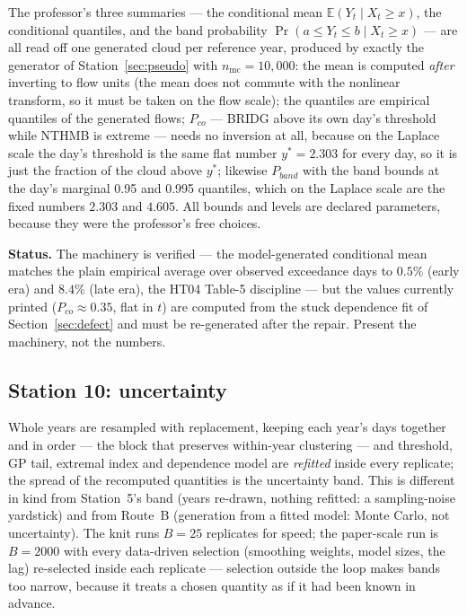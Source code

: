 \documentclass[11pt]{article}
\begin{document}
The professor's three summaries --- the conditional mean
$\mathbb{E}(Y_t \mid X_t \ge x)$, the conditional quantiles, and the band
probability $\Pr(a \le Y_t \le b \mid X_t \ge x)$ --- are all read off one
generated cloud per reference year, produced by exactly the generator of
Station~\ref{sec:pseudo} with $n_{\mathrm{mc}} = 10{,}000$: the mean is
computed \emph{after} inverting to flow units (the mean does not commute with
the nonlinear transform, so it must be taken on the flow scale); the
quantiles are empirical quantiles of the generated flows; $P_{co}$ --- BRIDG
above its own day's threshold while NTHMB is extreme --- needs no inversion
at all, because on the Laplace scale the day's threshold is the same flat
number $y^* = 2.303$ for every day, so it is just the fraction of the cloud
above $y^*$; likewise $P_{band}$ with the band bounds at the day's marginal
0.95 and 0.995 quantiles, which on the Laplace scale are the fixed numbers
$2.303$ and $4.605$. All bounds and levels are declared parameters, because
they were the professor's free choices.

\textbf{Status.} The machinery is verified --- the model-generated
conditional mean matches the plain empirical average over observed
exceedance days to $0.5\%$ (early era) and $8.4\%$ (late era), the HT04
Table-5 discipline --- but the values currently printed
($P_{co} \approx 0.35$, flat in $t$) are computed from the stuck dependence
fit of Section~\ref{sec:defect} and must be re-generated after the repair.
Present the machinery, not the numbers.

\subsection{Station 10: uncertainty}
\label{sec:boot}

Whole years are resampled with replacement, keeping each year's days together
and in order --- the block that preserves within-year clustering --- and
threshold, GP tail, extremal index and dependence model are \emph{refitted}
inside every replicate; the spread of the recomputed quantities is the
uncertainty band. This is different in kind from Station~5's band (years
re-drawn, nothing refitted: a sampling-noise yardstick) and from Route~B
(generation from a fitted model: Monte Carlo, not uncertainty). The knit runs
$B = 25$ replicates for speed; the paper-scale run is $B = 2000$ with every
data-driven selection (smoothing weights, model sizes, the lag) re-selected
inside each replicate --- selection outside the loop makes bands too narrow,
because it treats a chosen quantity as if it had been known in advance.
\end{document}
